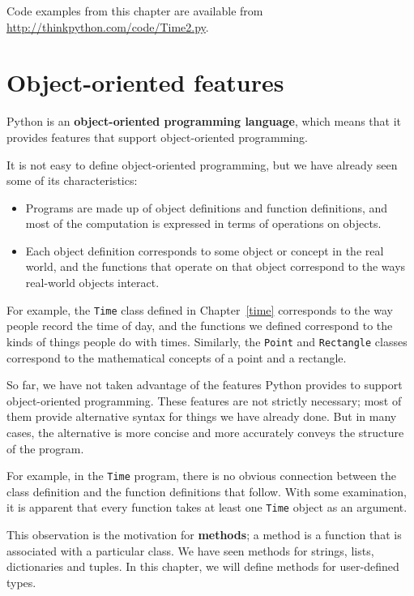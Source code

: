 \documentclass[10pt]{book}
\begin{document}
Code examples from this chapter are available from
\url{http://thinkpython.com/code/Time2.py}.

\section{Object-oriented features}

Python is an {\bf object-oriented programming language}, which means
that it provides features that support object-oriented
programming.

It is not easy to define object-oriented programming, but we have
already seen some of its characteristics:

\begin{itemize}

\item Programs are made up of object definitions and function
definitions, and most of the computation is expressed in terms
of operations on objects.

\item Each object definition corresponds to some object or concept
in the real world, and the functions that operate on that object
correspond to the ways real-world objects interact.

\end{itemize}

For example, the {\tt Time} class defined in Chapter~\ref{time}
corresponds to the way people record the time of day, and the
functions we defined correspond to the kinds of things people do with
times.  Similarly, the {\tt Point} and {\tt Rectangle} classes
correspond to the mathematical concepts of a point and a rectangle.

So far, we have not taken advantage of the features Python provides to
support object-oriented programming.  These
features are not strictly necessary; most of them provide
alternative syntax for things we have already done.  But in many cases,
the alternative is more concise and more accurately conveys the
structure of the program.

For example, in the {\tt Time} program, there is no obvious
connection between the class definition and the function definitions
that follow.  With some examination, it is apparent that every function
takes at least one {\tt Time} object as an argument.

This observation is the motivation for {\bf methods}; a method is
a function that is associated with a particular class.
We have seen methods for strings, lists, dictionaries and tuples.
In this chapter, we will define methods for user-defined types.
\end{document}
